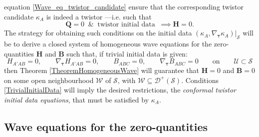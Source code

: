 \documentclass[10pt,a4paper]{article}
\theoremstyle{plain}
\def\bmB{{\bm B}}
\def\bmH{{\bm H}}
\def\bmQ{{\bm Q}}
\begin{document}
equation \eqref{Wave_eq_twistor_candidate} ensure that the corresponding twistor
candidate $\kappa_A$ is indeed a twistor ---i.e. such that
\begin{equation}
\bmQ =0 \;\;\&\;\; \text{twistor initial data} \;\;\implies \bmH=0.
\end{equation}
The strategy for obtaining such conditions on the initial data
$(\kappa_A, \nabla_{\bm\tau}
\kappa_A)|_{\mathcal{S}}$ will be to derive a closed
system of homogeneous wave equations for the zero-quantities $\bmH$
and $\bmB$ such that, if trivial initial data is given:
\begin{equation}\label{TrivialInitialData}
H_{A'AB}=0, \qquad \nabla_{\bm\tau} H_{A'AB}=0, \qquad B_{ABC}=0,
\qquad \nabla_{\bm\tau} B_{ABC}=0 \qquad \text{on} \qquad
\mathcal{U}\subset\mathcal{S}
\end{equation}
then Theorem \ref{TheoremHomogeneousWave} will guarantee that
$\bmH=0$ and $\bmB=0$ on some open neighbourhood $\mathcal{W}$ of $\mathcal{S}$, with
$\mathcal{W}\subseteq \mathcal{D}^{+}(\mathcal{S})$. Conditions \eqref{TrivialInitialData} will imply the desired restrictions, the \emph{conformal twistor initial data equations}, that must be satisfied by $\kappa_A$.  

\subsection{Wave equations for the zero-quantities}
\end{document}
